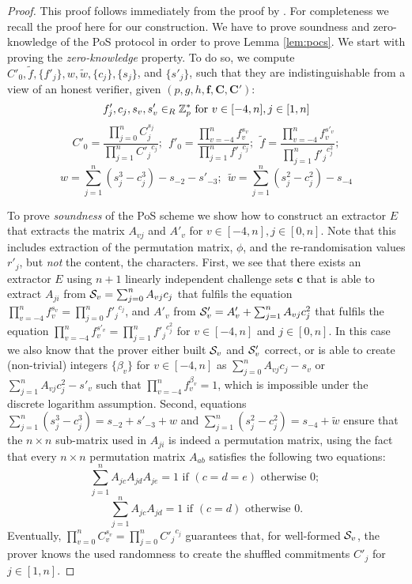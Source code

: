 \begin{proof}
This proof follows immediately from the proof by \citet{Furukawa05}.
For completeness we recall the proof here for our construction.
We have to prove soundness and zero-knowledge of the \ac{PoS} protocol in order to prove Lemma \ref{lem:pocs}.
We start with proving the \emph{zero-knowledge} property.
To do so, we compute $C'_0, \tilde{f}, \{f'_j\}, w, \tilde{w}, \{c_j\}, \{s_j\}$, and $\{s'_j\}$, such that they are indistinguishable from a view of an honest verifier, given $(p,g,h,\bm f, \bm C, \bm C')$:
  \[
    f'_j, c_j, s_v, s'_v \in_R \mathbb{Z}^\ast_p \text{ for } v\in[-4,n], j\in[1,n]
  \]
  \[
    C'_0 = \frac{\prod_{j=0}^n C_j^{s_j}}{\prod_{j=1}^n {C'_j}^{c_j}};~~
    f'_0 = \frac{\prod_{v=-4}^n f_v^{s_v}}{\prod_{j=1}^n {f'_j}^{c_j}};~~
    \tilde{f} = \frac{\prod_{v=-4}^n f_v^{s'_v}}{\prod_{j=1}^n {f'_j}^{c^2_j}};
  \]
  \[
    w = \sum_{j=1}^n (s_j^3 - c_j^3) - s_{-2} - s'_{-3};~~
    \tilde{w} = \sum_{j=1}^n (s_j^2 - c_j^2) - s_{-4}
  \]

\noindent
To prove \emph{soundness} of the \ac{PoS} scheme we show how to construct an extractor $E$ that extracts the matrix $A_{vj}$ and $A'_v$ for $v\in[-4,n], j\in[0,n]$.
  Note that this includes extraction of the permutation matrix, \ie $\phi$, and the re-randomisation values $r'_j$, but \emph{not} the content, \ie the characters.
  First, we see that there exists an extractor $E$ using $n+1$ linearly independent challenge sets $\bm c$ that is able to extract $A_{ji}$ from $\mathcal{S}_v=\sum_{j=0}^n A_{vj}c_j$ that fulfils the equation $\prod_{v=-4}^n f_v^{s_v}=\prod_{j=0}^n {f'_j}^{c_j}$, and $A'_v$ from $\mathcal{S}'_v=A'_v + \sum_{j=1}^n A_{vj}c_j^2$ that fulfils the equation $\prod_{v=-4}^n f_v^{s'_v}=\prod_{j=1}^n {f'_j}^{c^2_j}$ for $v\in[-4,n]$ and $j\in[0,n]$.
  In this case we also know that the prover either built $\mathcal{S}_v$ and $\mathcal{S}'_v$ correct, or is able to create (non-trivial) integers $\{\beta_v\}$ for $v\in[-4,n]$ as $\sum_{j=0}^n A_{vj}c_j - s_v$ or $\sum_{j=1}^n A_{vj}c^2_j - s'_v$ such that $\prod_{v=-4}^n f_v^{\beta_v} = 1$, which is impossible under the discrete logarithm assumption.
  Second, equations $\sum_{j=1}^n (s_j^3 - c_j^3)=s_{-2} + s'_{-3} + w$ and $\sum_{j=1}^n (s_j^2 - c_j^2)= s_{-4} + \tilde{w}$ ensure that the $n\times n$ sub-matrix used in $A_{ji}$ is indeed a permutation matrix, using the fact that every $n\times n$ permutation matrix $A_{ab}$ satisfies the following two equations:
  \[
    \sum_{j=1}^n A_{jc} A_{jd} A_{je} = 1 \text{ if } (c=d=e) \text{ otherwise } 0; ~
  \]
  \[
    \sum_{j=1}^n A_{jc} A_{jd} = 1 \text{ if } (c=d) \text{ otherwise } 0.
  \]
  Eventually, $\prod_{v=0}^n C_v^{s_v}=\prod_{j=0}^n {C'_j}^{c_j}$ guarantees that, for well-formed $\mathcal{S}_v$, the prover knows the used randomness to create the shuffled commitments $C'_j$ for $j\in[1,n]$.
\end{proof}


